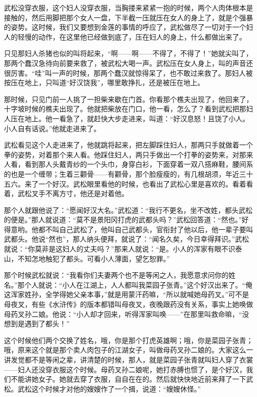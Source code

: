 \par 武松没穿衣服，这个妇人没穿衣服，当胸搂来紧紧一抱的时候，两个人肉体根本是接触的，然后用脚把那个女人一盘，下半截一压就压在女人的身上了，就是个强暴的姿势。这时候，我们又要想到金莲的事情的呼应了，武松做尽了一切对于一个妇人的轻慢的动作，在这里他已经做到底了，压在妇人的身上，什么都做出来了。
\par 只见那妇人杀猪也似的叫将起来，“啊——啊——不得了，不得了！”她就尖叫了，那两个蠢汉急待向前要来救了，被武松大喝一声。武松压在女人身上，叫的声音还很厉害。“哇”叫一声的时候，那两个蠢汉就惊得呆了，也不敢过来救了。那妇人被按压在地上，只叫道“好汉饶我”，哪里敢挣扎，还是被压在地上。
\par 那时候，只见门前一人挑了一担柴来歇在门首。你看那个樵夫出现了，他回来了，十字坡时候的樵夫出现了。他就把柴放在门口，他一看，怎么了？看到武松把那妇人压在地上。他一看急了，就赶快大步走进来，叫道：“好汉息怒！且饶了小人。小人自有话说。”他就走进来了。
\par 武松看见这个人走进来了，他就跳将起来，把左脚踩住妇人，那两只手就做着一个拳的姿势，对着那个来人看。他踩住妇人，两只手做出一个打拳的姿势来，对那来人看，看到那人头戴青纱的一个头巾，身穿白衫，下面穿着一双八搭麻鞋，腰间系的也是一个缠带；生着三颧骨——有颧骨，那个脸瘦瘦的，有几根胡须，年近三十五六。来了一个好汉。武松眼里看他的时候，也看出了武松心里是喜欢的。看着看着，武松叉手不离方寸，他还是对着他。
\par 那个人就跟他说了：“愿闻好汉大名。”武松道：“我行不更名，坐不改姓，都头武松的便是。”那人就说道：“莫不是景阳冈打虎的武都头吗？”武松回答道：“然也。”好得意哟。他都不叫自己武松了，他叫自己武都头，官衔封了他以后，他一辈子要叫武都头。他说“然也”，那人纳头便拜，就说了：“闻名久矣，今日幸得拜识。”武松就说：“你莫非是这妇人的丈夫吗？”那来人就说：“是。小人的浑家有眼不识泰山，不知怎地触犯了都头。可看小人薄面，望乞恕罪。”
\par 那个时候武松就说：“我看你们夫妻两个也不是等闲之人，我愿意求问你的姓名。”那个人就说：“小人在江湖上，人人都叫我菜园子张青。”这个好汉出来了。“俺这浑家姓孙，全学得她父亲本事，”就是用蒙汗药嘛，“所以就喊她母药叉。”可不是母夜叉，有些《水浒传》的版本都错叫母夜叉，夜晚跟药没有关系，事实上她唤做母药叉孙二娘。他说：“小人却才回来，听得浑家叫唤——”在那里叫救命嘛，“没想到是遇到了都头！”
\par 这个时候他们两个交换了姓名，哦，你是那个打虎英雄啊；哦，你是菜园子张青；哦，原来这个就是那个卖人肉包子的江湖女子，叫做母药叉孙二娘的。大家这么一讲发觉都不是等闲之辈，讲清楚的时候，那人，就是菜园子张青就叫妇人穿了衣裳——妇人还没穿衣服这个时候。母药叉孙二娘呢，她打赤膊也惯了，是个好汉，我们不能讲她女子。她就去穿了衣服，自自在在的。然后就快快地近前来拜了一下武松。武松这个时候才对他的嫂嫂作了一个揖，说道：“嫂嫂休怪。”
